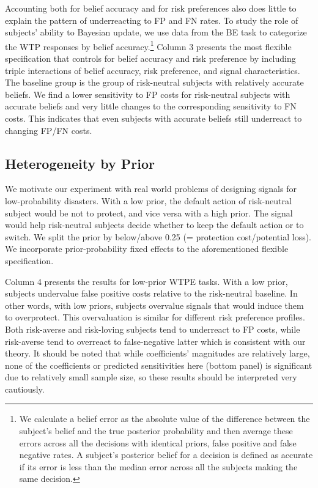 \documentclass[12pt,a4paper]{article}
\begin{document}
Accounting both for belief accuracy and for risk preferences also does little to explain the pattern of underreacting to FP and FN rates. To study the role of subjects' ability to Bayesian update, we use data from the BE task to categorize the WTP responses by belief accuracy.\footnote{We calculate a belief error as the absolute value of the difference between the subject's belief and the true posterior probability and then average these errors across all the decisions with identical priors, false positive and false negative rates. A subject's posterior belief for a decision is defined as accurate if its error is less than the median error across all the subjects making the same decision.} Column 3 presents the most flexible specification that controls for belief accuracy and risk preference by including triple interactions of belief accuracy, risk preference, and signal characteristics. The baseline group is the group of risk-neutral subjects with relatively accurate beliefs. We find a lower sensitivity to FP costs for risk-neutral subjects with accurate beliefs and very little changes to the corresponding sensitivity to FN costs. This indicates that even subjects with accurate beliefs still underreact to changing FP/FN costs.
  

\subsection{Heterogeneity by Prior}

We motivate our experiment with real world problems of designing signals for low-probability disasters. With a low prior, the default action of risk-neutral subject would be not to protect, and vice versa with a high prior. The signal would help risk-neutral subjects decide whether to keep the default action or to switch. We split the prior by below/above 0.25 (= protection cost/potential loss).  We incorporate prior-probability fixed effects to the aforementioned flexible specification. 

Column 4 presents the results for low-prior WTPE tasks. With a low prior, subjects undervalue false positive costs relative to the risk-neutral baseline. In other words, with low priors, subjects overvalue signals that would induce them to overprotect. This overvaluation is similar for different risk preference profiles. Both risk-averse and risk-loving subjects tend to underreact to FP costs, while risk-averse tend to overreact to false-negative latter which is consistent with our theory. It should be noted that while coefficients' magnitudes are relatively large, none of the coefficients or predicted sensitivities here (bottom panel) is significant due to relatively small sample size, so these results should be interpreted very cautiously. 
\end{document}
